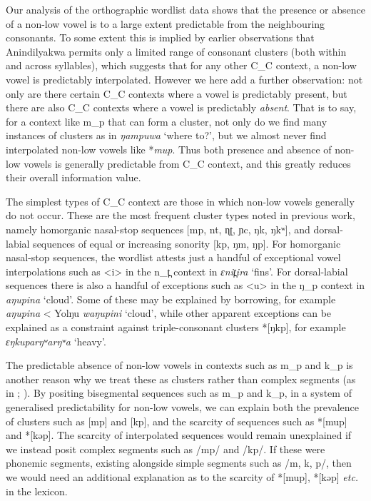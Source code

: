 \documentclass[output=paper,colorlinks,citecolor=brown]{langscibook}
\begin{document}
Our analysis of the orthographic wordlist data shows that the presence or absence of a non-low vowel is to a large extent predictable from the neighbouring consonants. To some extent this is implied by earlier observations that Anindilyakwa permits only a limited range of consonant clusters (both within and across syllables), which suggests that for any other \textsc{C\_C} context, a non-low vowel is predictably interpolated. However we here add a further observation: not only are there certain \textsc{C\_C} contexts where a vowel is predictably present, but there are also \textsc{C\_C} contexts where a vowel is predictably \textit{absent}. That is to say, for a context like m\_p that can form a cluster, not only do we find many instances of clusters as in \textit{ŋampuwa} ‘where to?’, but we almost never find interpolated non-low vowels like *\textit{mup}. Thus both presence and absence of non-low vowels is generally predictable from \textsc{C\_C} context, and this greatly reduces their overall information value.

The simplest types of \textsc{C\_C} context are those in which non-low vowels generally do not occur. These are the most frequent cluster types noted in previous work, namely homorganic nasal-stop sequences [mp, nt, ɳʈ, ɲc, ŋk, ŋkʷ], and dorsal-labial sequences of equal or increasing sonority [kp, ŋm, ŋp]. For homorganic nasal-stop sequences, the wordlist attests just a handful of exceptional vowel interpolations such as <i> in the n\_t̪ context in \textit{ɛnit̪ira} ‘fins’. For dorsal-labial sequences there is also a handful of exceptions such as <u> in the ŋ\_p context in \textit{aŋupina} ‘cloud’. Some of these may be explained by borrowing, for example \textit{aŋupina} < Yolŋu \textit{waŋupini} ‘cloud’, while other apparent exceptions can be explained as a constraint against triple-consonant clusters *[ŋkp], for example \textit{ɛŋkuparŋʷarŋʷa} ‘heavy’.

The predictable absence of non-low vowels in contexts such as m\_p and k\_p is another reason why we treat these as clusters rather than complex segments (as in \citealt{vanEgmond2012};  \citealt{vanEgmondBaker2020}). By positing bisegmental sequences such as m\_p and k\_p, in a system of generalised predictability for non-low vowels, we can explain both the prevalence of clusters such as [mp] and [kp], and the scarcity of sequences such as *[mup] and *[kəp]. The scarcity of interpolated sequences would remain unexplained if we instead posit complex segments such as /mp/ and /kp/. If these were phonemic segments, existing alongside simple segments such as /m, k, p/, then we would need an additional explanation as to the scarcity of *[mup], *[kəp] \textit{etc.} in the lexicon.
\end{document}
